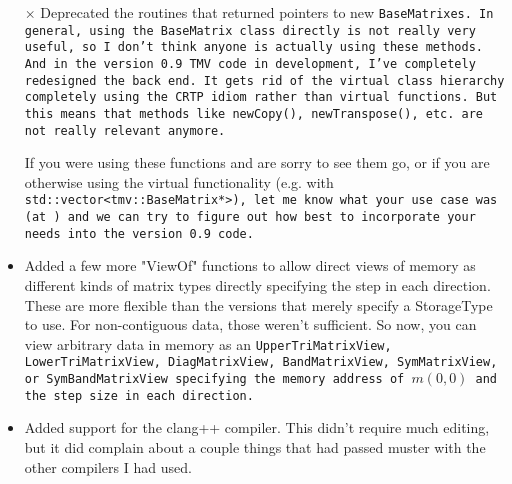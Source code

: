 \begin{itemize}
\item[$\times$] 
Deprecated the routines that returned pointers to new \tt{BaseMatrix}es.  In general, using the \tt{BaseMatrix} class directly is not really very useful, so I don't think anyone is actually using these methods.  And in the version 0.9 TMV code in development, I've completely redesigned the back end.  It gets rid of the virtual class hierarchy completely using the CRTP idiom rather than virtual functions.  But this means that methods like \tt{newCopy()}, \tt{newTranspose()}, etc. are not really relevant anymore.  

If you were using these functions and are sorry to see them go, or if you are otherwise using the virtual functionality (e.g. with \tt{std::vector<tmv::BaseMatrix*>}), let me know what your use case was (at \mygroup) and we can try to figure out how best to incorporate your needs into the version 0.9 code.

\item 
Added a few more "ViewOf" functions to allow direct views of memory as different kinds of matrix types directly specifying the step in each direction.  These are more flexible than the versions that merely specify a StorageType to use.  For non-contiguous data, those weren't sufficient.  So now, you can view arbitrary data in memory as an \tt{UpperTriMatrixView}, \tt{LowerTriMatrixView},
\tt{DiagMatrixView}, \tt{BandMatrixView}, \tt{SymMatrixView}, or \tt{SymBandMatrixView} specifying the memory address of $m(0,0)$ and the step size in each direction.

\item 
Added support for the clang++ compiler.  This didn't require much editing, but it did complain about a couple things that had passed muster with the other compilers I had used.



\end{itemize}
